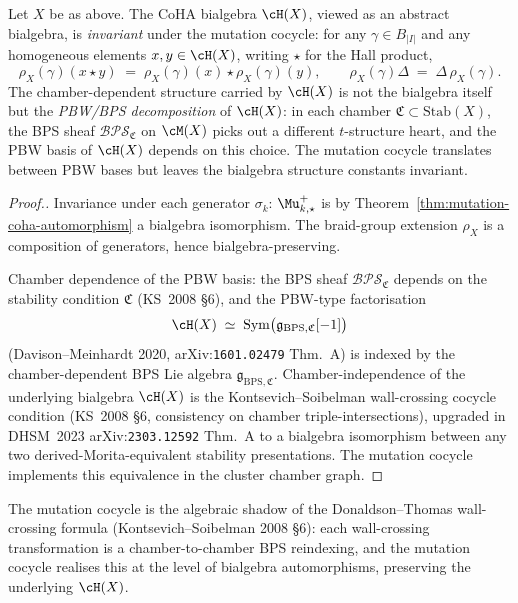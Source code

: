 \begin{corollary}
\label{cor:chamber-independence}
Let $X$ be as above. The CoHA bialgebra $\cH(X)$,
viewed as an abstract bialgebra, is \emph{invariant} under the mutation
cocycle: for any $\gamma \in B_{|I|}$ and any homogeneous elements $x, y
\in \cH(X)$, writing $\star$ for the Hall product,
\[
 \rho_X(\gamma)(x \star y) \;=\; \rho_X(\gamma)(x) \star \rho_X(\gamma)(y),
 \qquad
 \rho_X(\gamma) \Delta \;=\; \Delta\, \rho_X(\gamma).
\]
The chamber-dependent structure carried by $\cH(X)$ is not the bialgebra
itself but the \emph{PBW/BPS decomposition} of $\cH(X)$: in each chamber
$\mathfrak{C} \subset \mathrm{Stab}(X)$, the BPS sheaf
$\mathcal{BPS}_{\mathfrak{C}}$ on $\cM(X)$ picks out a different
$t$-structure heart, and the PBW basis of $\cH(X)$ depends on this choice.
The mutation cocycle translates between PBW bases but leaves the bialgebra
structure constants invariant.
\end{corollary}

\begin{proof}[Proof.]
Invariance under each generator $\sigma_k$: $\Mu_{k,\star}^{+}$ is by
Theorem~\ref{thm:mutation-coha-automorphism} a bialgebra isomorphism. The
braid-group extension $\rho_X$ is a composition of generators, hence
bialgebra-preserving.

Chamber dependence of the PBW basis: the BPS sheaf
$\mathcal{BPS}_{\mathfrak{C}}$ depends on the stability condition
$\mathfrak{C}$ (KS~2008 \S6), and the PBW-type factorisation
\[
 \cH(X) \;\simeq\; \mathrm{Sym}\bigl(\mathfrak{g}_{\mathrm{BPS}, \mathfrak{C}}[-1]\bigr)
\]
(Davison--Meinhardt 2020, arXiv:\texttt{1601.02479} Thm.~A) is indexed
by the chamber-dependent BPS Lie algebra $\mathfrak{g}_{\mathrm{BPS},
\mathfrak{C}}$. Chamber-independence of the underlying bialgebra
$\cH(X)$ is the Kontsevich--Soibelman wall-crossing cocycle condition
(KS~2008 \S6, consistency on chamber triple-intersections), upgraded in
DHSM~2023 arXiv:\texttt{2303.12592} Thm.~A to a bialgebra isomorphism
between any two derived-Morita-equivalent stability presentations. The
mutation cocycle implements this equivalence in the cluster chamber graph.
\end{proof}

The mutation cocycle is the algebraic shadow of the Donaldson--Thomas
wall-crossing formula (Kontsevich--Soibelman 2008 \S6): each wall-crossing
transformation is a chamber-to-chamber BPS reindexing, and the mutation
cocycle realises this at the level of bialgebra automorphisms, preserving
the underlying $\cH(X)$.

